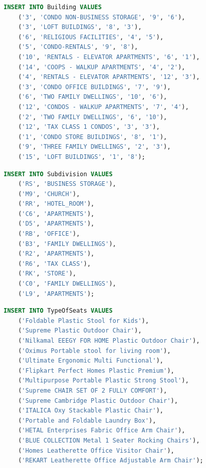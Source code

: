 \documentclass[a4paper,12pt]{article}
\begin{document}
	\begin{lstlisting}[language=SQL]
	INSERT INTO Building VALUES
	('3', 'CONDO NON-BUSINESS STORAGE', '9', '6'),
	('3', 'LOFT BUILDINGS', '8', '3'),
	('6', 'RELIGIOUS FACILITIES', '4', '5'),
	('5', 'CONDO-RENTALS', '9', '8'),
	('10', 'RENTALS - ELEVATOR APARTMENTS', '6', '1'),
	('14', 'COOPS - WALKUP APARTMENTS', '4', '2'),
	('4', 'RENTALS - ELEVATOR APARTMENTS', '12', '3'),
	('3', 'CONDO OFFICE BUILDINGS', '7', '9'),
	('6', 'TWO FAMILY DWELLINGS', '10', '6'),
	('12', 'CONDOS - WALKUP APARTMENTS', '7', '4'),
	('2', 'TWO FAMILY DWELLINGS', '6', '10'),
	('12', 'TAX CLASS 1 CONDOS', '3', '3'),
	('1', 'CONDO STORE BUILDINGS', '8', '1'),
	('9', 'THREE FAMILY DWELLINGS', '2', '3'),
	('15', 'LOFT BUILDINGS', '1', '8');
	\end{lstlisting}
	
	
	\begin{lstlisting}[language=SQL]
	INSERT INTO Subdivision VALUES
	('RS', 'BUSINESS STORAGE'),
	('M9', 'CHURCH'),
	('RR', 'HOTEL_ROOM'),
	('C6', 'APARTMENTS'),
	('D5', 'APARTMENTS'),
	('RB', 'OFFICE'),
	('B3', 'FAMILY DWELLINGS'),
	('R2', 'APARTMENTS'),
	('R6', 'TAX CLASS'),
	('RK', 'STORE'),
	('C0', 'FAMILY DWELLINGS'),
	('L9', 'APARTMENTS');
	\end{lstlisting}
	
\newpage
	\begin{lstlisting}[language=SQL]
	INSERT INTO TypeOfSeats VALUES
	('Foldable Plastic Stool for Kids'),
	('Supreme Plastic Outdoor Chair'),
	('Nilkamal EEEGY FOR HOME Plastic Outdoor Chair'),
	('Oximus Portable stool for living room'),
	('Ultimate Ergonomic Multi Functional'),
	('Flipkart Perfect Homes Plastic Premium'),
	('Multipurpose Portable Plastic Strong Stool'),
	('Supreme CHAIR SET OF 2 FULLY COMFORT'),
	('Supreme Cambridge Plastic Outdoor Chair'),
	('ITALICA Oxy Stackable Plastic Chair'),
	('Portable and Foldable Laundry Box'),
	('HETAL Enterprises Fabric Office Arm Chair'),
	('BLUE COLLECTION Metal 1 Seater Rocking Chairs'),
	('Homes Leatherette Office Visitor Chair'),
	('REKART Leatherette Office Adjustable Arm Chair');
	\end{lstlisting}
	
\end{document}
